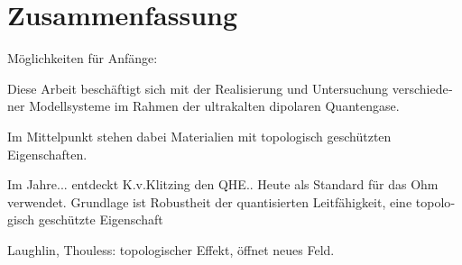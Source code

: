 \chapter*{Zusammenfassung}

\begin{otherlanguage}{ngerman}

Möglichkeiten für Anfänge:

Diese Arbeit beschäftigt sich mit der Realisierung und Untersuchung
verschiedener Modellsysteme im Rahmen der ultrakalten dipolaren
Quantengase.

Im Mittelpunkt stehen dabei Materialien mit topologisch geschützten
Eigenschaften.

Im Jahre... entdeckt K.v.Klitzing den QHE.. Heute als Standard für
das Ohm verwendet. Grundlage ist Robustheit der quantisierten Leitfähigkeit,
eine topologisch geschützte Eigenschaft

Laughlin, Thouless: topologischer Effekt, öffnet neues Feld.


\end{otherlanguage}
